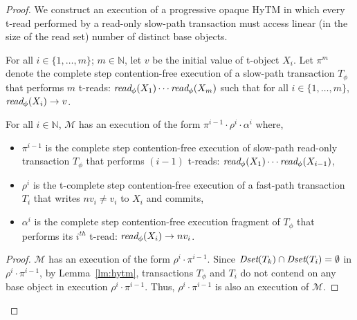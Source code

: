 %
\begin{proof}
We construct an execution of a progressive opaque HyTM in which every t-read performed by a read-only slow-path transaction
must access linear (in the size of the read set) number of distinct base objects.

For all $i\in \{1,\ldots , m\}$; $m \in \mathbb{N}$, let 
$v$ be the initial value of t-object $X_i$.
Let $\pi^{m}$ denote the complete step contention-free execution of a slow-path transaction
$T_{\phi}$ that performs ${m}$ t-reads: $\textit{read}_{\phi}(X_1)\cdots \textit{read}_{\phi}(X_{m})$
such that for all $i\in \{1,\ldots , m \}$, $\textit{read}_{\phi}(X_i) \rightarrow v$.
%
\begin{claim}
\label{cl:readdap}
For all $i\in \mathbb{N}$, $\mathcal{M}$ has an execution of the form $\pi^{i-1}\cdot \rho^i\cdot \alpha^i$ where,
%
\begin{itemize}
\item
$\pi^{i-1}$ is the complete step contention-free execution of slow-path read-only transaction $T_{\phi}$ that performs
$(i-1)$ t-reads: $\textit{read}_{\phi}(X_1)\cdots \textit{read}_{\phi}(X_{i-1})$,
\item
$\rho^i$ is the t-complete step contention-free execution of a fast-path transaction $T_{i}$
that writes $nv_i\neq v_i$ to $X_i$ and commits,
\item
$\alpha^i$ is the complete step contention-free execution fragment of $T_{\phi}$ that performs its $i^{th}$ t-read:
$\textit{read}_{\phi}(X_i) \rightarrow nv_i$.
\end{itemize}
%
\end{claim}
%
\begin{proof}
%
$\mathcal{M}$ has an execution of the form $\rho^i\cdot \pi^{i-1}$.
Since $\textit{Dset}(T_k) \cap \textit{Dset}(T_{i}) =\emptyset$ in $\rho^i\cdot \pi^{i-1}$,
by Lemma~\ref{lm:hytm}, transactions $T_{\phi}$ and $T_i$ do not contend
on any base object in execution $\rho^i\cdot \pi^{i-1}$.
Thus, $\rho^i\cdot \pi^{i-1}$ is also an execution of $\mathcal{M}$.


\end{proof}
\end{proof}
